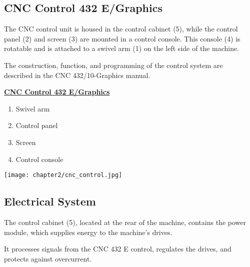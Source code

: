 \newpage

\subsection{CNC Control 432 E/Graphics}

The CNC control unit is housed in the control cabinet (5), while the control panel (2) and screen (3) are mounted in a control console. This console (4) is rotatable and is attached to a swivel arm (1) on the left side of the machine.

\vspace{0.3cm}

\noindent The construction, function, and programming of the control system are \\described in the CNC 432/10-Graphics manual.

\vspace{-.3cm}


\begin{minipage}[b]{0.5\textwidth}
    \textbf{\uline{CNC Control 432 E/Graphics}}
    \begin{enumerate}[itemsep=1pt,parsep=0pt]
        \item Swivel arm
        \item Control panel
        \item Screen
        \item Control console
    \end{enumerate}
\end{minipage}%
\begin{minipage}{0.5\textwidth}
    \centering
    \texttt{[image: chapter2/cnc\_control.jpg]}
    \label{fig:cnc_control}
\end{minipage}

\vspace{-1cm}

\subsection{Electrical System}

The control cabinet (5), located at the rear of the machine, contains the power module, which supplies energy to the machine’s drives.

\vspace{0.3cm}

\noindent It processes signals from the CNC 432 E control, regulates the drives, and protects against overcurrent.

